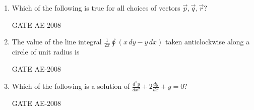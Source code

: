 \documentclass[journal,12pt,onecolumn]{IEEEtran}
\theoremstyle{remark}
\begin{document}
\begin{enumerate}
    \quad
    
    \item Which of the following is true for all choices of vectors $\vec{p}, \vec{q}, \vec{r}$?\\
    \begin{enumerate}
    \end{enumerate}
    \hfill{GATE AE-2008}

\quad

    \item  The value of the line integral
    $
    \frac{1}{2\pi} \oint (x\,dy - y\,dx)
    $
    taken anticlockwise along a circle of unit radius is\\
    \begin{enumerate}
    \end{enumerate}
\hfill{GATE AE-2008}

\quad

    \item Which of the following is a solution of 
    $
    \frac{d^2 y}{dx^2} + 2\frac{dy}{dx} + y = 0 ?
    $\\
    \begin{enumerate}
    \end{enumerate}
    \hfill{GATE AE-2008}


\end{enumerate}
\end{document}
